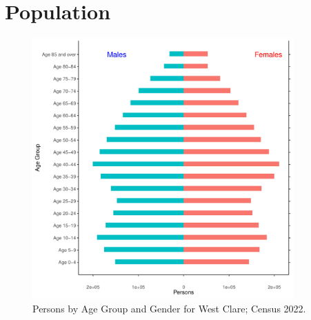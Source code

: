 \documentclass{article}
\begin{document}
\pagebreak

\section{Population} 
\label{sect:Pop}

\begin{figure}[h]
	\centering
	\includegraphics[width = 100mm]{../figures/PyramidPlot.pdf}
	\caption{Persons by Age Group and Gender for West Clare; Census 2022.}
	\label{fig:2ae19629-1a6a-13a3-e055-000000000001}
	\end{figure}
\end{document}

